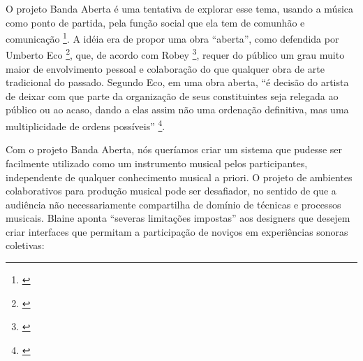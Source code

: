 
O projeto Banda Aberta é uma tentativa de explorar esse tema, usando a música como ponto de partida, pela função social que ela tem de comunhão e comunicação \footnote{\cite{Koelsch:2014}}. A idéia era de propor uma obra ``aberta'', como defendida por Umberto Eco \footnote{\cite{Eco1991}}, que, de acordo com Robey \footnote{\cite{Eco1991}}, requer do público um grau muito maior de envolvimento pessoal e colaboração do que qualquer obra de arte tradicional do passado. Segundo Eco, em uma obra aberta, ``é decisão do artista de deixar com que parte da organização de seus constituintes seja relegada ao público ou ao acaso, dando a elas assim não uma ordenação definitiva, mas uma multiplicidade de ordens possíveis'' \footnote{\cite{Eco1991}}.

Com o projeto Banda Aberta, nós queríamos criar um sistema que pudesse ser facilmente utilizado como um instrumento musical pelos participantes, independente de qualquer conhecimento musical a priori. O projeto de ambientes colaborativos para produção musical pode ser desafiador, no sentido de que a audiência não necessariamente compartilha de domínio de técnicas e processos musicais. Blaine \citeyear{Blaine2003} aponta ``severas limitações impostas'' aos designers que desejem criar interfaces que permitam a participação de noviços em experiências sonoras coletivas: 

